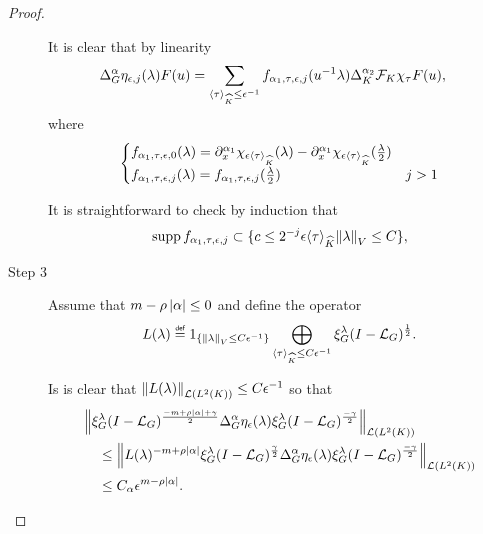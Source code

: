 \begin{proof}
\begin{description}
            It is clear that by linearity
            \begin{align*}
                \DifferenceOperatorOrder \alpha \eta_{\epsilon, j}(\lambda) F(u)
                &= \sum_{\JapaneseBracket \CompactGroup \tau \leq \epsilon^{-1}}
                f_{\alpha_1, \tau, \epsilon, j}(u^{-1} \lambda)
                \DifferenceOperatorOrder [\CompactGroup] {\alpha_2} \Fourier [\CompactGroup] \chi_\tau F(u),
            \end{align*}
            where
            \begin{align*}
                \begin{cases}
                f_{\alpha_1, \tau, \epsilon, 0}(\lambda)
                = \iD {x^{\alpha_1} } \chi_{\epsilon \JapaneseBracket \CompactGroup \tau}(\lambda) - \iD {x^{\alpha_1} } \chi_{\epsilon \JapaneseBracket \CompactGroup \tau}(\frac \lambda 2)\\
                f_{\alpha_1, \tau, \epsilon, j}(\lambda)
                = f_{\alpha_1, \tau, \epsilon, j}(\frac \lambda 2) & j > 1
                \end{cases}
            \end{align*}

            It is straightforward to check by induction that
            \begin{align*}
                \supp f_{\alpha_1, \tau, \epsilon, j} \subset \{c \leq 2^{-j} \epsilon \JapaneseBracket \CompactGroup \tau \norm \lambda \leq C\},
            \end{align*}
        \item [Step 3] Assume that $m - \rho \abs \alpha \leq 0$ and define the operator
            \begin{align*}
                L(\lambda) \defeq 1_{\{\norm \lambda \leq C \epsilon^{-1}\}} \bigoplus_{\JapaneseBracket \CompactGroup \tau \leq C \epsilon^{-1}} \Rep \lambda \BesselPotential 1.
            \end{align*}

            Is is clear that $\norm [\Lin {\Lebesgue 2 \CompactGroup}] {L(\lambda)} \leq C \epsilon^{-1}$ so that
            \begin{align*}
                &\norm [\Lin {\Lebesgue 2 \CompactGroup}] {%
                    \Rep \lambda \BesselPotential {-m + \rho \abs\alpha + \gamma}
                    \DifferenceOperatorOrder \alpha \eta_\epsilon(\lambda)
                    \Rep \lambda \BesselPotential {-\gamma}
                }\\
                &\quad \leq \norm [\Lin {\Lebesgue 2 \CompactGroup}] {%
                    L(\lambda)^{-m + \rho \abs \alpha}
                    \Rep \lambda \BesselPotential \gamma
                    \DifferenceOperatorOrder \alpha \eta_\epsilon(\lambda)
                    \Rep \lambda \BesselPotential {-\gamma}
                }\\
                &\quad \leq C_\alpha \epsilon^{m - \rho \abs \alpha}.
            \end{align*}


\end{description}
\end{proof}
